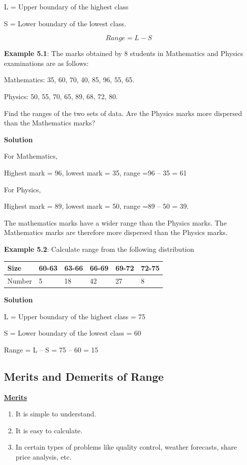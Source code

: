 \documentclass[
]{book}
\begin{document}
L = Upper boundary of the highest class

S = Lower boundary of the lowest class.

\[Range = L - S\]

\textbf{Example 5.1}: The marks obtained by 8 students in Mathematics and
Physics examinations are as follows:

Mathematics: 35, 60, 70, 40, 85, 96, 55, 65.

Physics: 50, 55, 70, 65, 89, 68, 72, 80.

Find the ranges of the two sets of data. Are the Physics marks more
dispersed than the Mathematics marks?

\textbf{Solution}

For Mathematics,

Highest mark = 96, lowest mark = 35, range =96 -- 35 = 61

For Physics,

Highest mark = 89, lowest mark = 50, range =89 -- 50 = 39.

The mathematics marks have a wider range than the Physics marks. The
Mathematics marks are therefore more dispersed than the Physics marks.

\textbf{Example 5.2}: Calculate range from the following distribution

\begin{longtable}[]{@{}llllll@{}}
\toprule\noalign{}
Size & 60-63 & 63-66 & 66-69 & 69-72 & 72-75 \\
\midrule\noalign{}
\endhead
\bottomrule\noalign{}
\endlastfoot
Number & 5 & 18 & 42 & 27 & 8 \\
\end{longtable}

\textbf{Solution}

L = Upper boundary of the highest class = 75

S = Lower boundary of the lowest class = 60

Range = L -- S = 75 -- 60 = 15

\hypertarget{merits-and-demerits-of-range}{%
\subsection{Merits and Demerits of Range}\label{merits-and-demerits-of-range}}

\ul{\textbf{Merits}}

\begin{enumerate}
\def\labelenumi{\arabic{enumi}.}
\item
  It is simple to understand.
\item
  It is easy to calculate.
\item
  In certain types of problems like quality control, weather
  forecasts, share price analysis, etc.
\end{enumerate}
\end{document}
